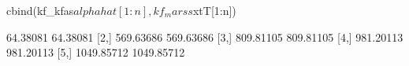 \begin{Schunk}
\begin{Sinput}
 cbind(kf_kfas$alphahat[1:n], kf_marss$xtT[1:n])
\end{Sinput}
\begin{Soutput}
           [,1]       [,2]
[1,]   64.38081   64.38081
[2,]  569.63686  569.63686
[3,]  809.81105  809.81105
[4,]  981.20113  981.20113
[5,] 1049.85712 1049.85712
\end{Soutput}
\end{Schunk}
